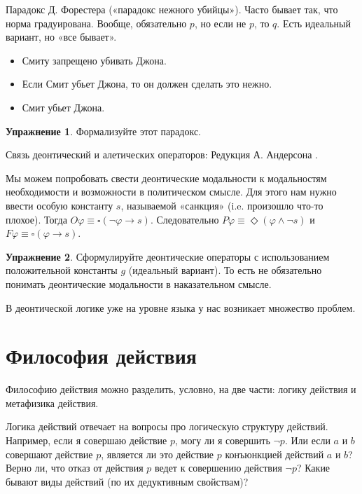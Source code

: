 \documentclass[openany]{book}
\theoremstyle{plain}
\theoremstyle{definition}
\newtheorem{xrc}{Упражнение}[]
\begin{document}
Парадокс Д. Форестера («парадокс нежного убийцы»). Часто бывает так, что норма градуирована. Вообще, обязательно \(p\), но если не \(p\), то \(q\). Есть идеальный вариант, но «все бывает».

\begin{itemize}
\item{Смиту запрещено убивать Джона.}
\item{Если Смит убьет Джона, то он должен сделать это нежно.}
\item{Смит убьет Джона.}
\end{itemize}

\begin{xrc}
Формализуйте этот парадокс.
\end{xrc}

Связь деонтический и алетических операторов: Редукция А. Андерсона \cite{Anderson}. 

Мы можем попробовать свести деонтические модальности к модальностям необходимости и возможности в политическом смысле. Для этого нам нужно ввести особую константу \(s\), называемой «санкция» (i.e. произошло что-то плохое). Тогда \(O \varphi \equiv \square (\neg \varphi \to s)\). Следовательно \(P \varphi \equiv \Diamond (\varphi \land \neg s)\) и \(F \varphi \equiv \square (\varphi \to s)\).

\begin{xrc}
Сформулируйте деонтические операторы с использованием положительной константы \(g\) (идеальный вариант). То есть не обязательно понимать деонтические модальности в наказательном смысле.
\end{xrc}

В деонтической логике уже на уровне языка у нас возникает множество проблем.

\section{Философия действия}

Философию действия можно разделить, условно, на две части: логику действия и метафизика действия.

Логика действий отвечает на вопросы про логическую структуру действий. Например, если я совершаю действие \(p\), могу ли я совершить \(\neg p\). Или если \(a\) и \(b\) совершают действие \(p\), является ли это действие \(p\) конъюнкцией действий \(a\) и \(b\)? Верно ли, что отказ от действия \(p\) ведет к совершению действия \(\neg p\)? Какие бывают виды действий (по их дедуктивным свойствам)?
\end{document}
